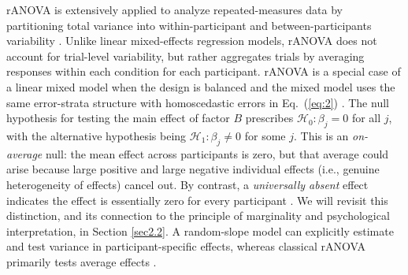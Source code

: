 \documentclass[preprint,12pt,authoryear]{elsarticle}
\begin{document}
rANOVA is extensively applied to analyze repeated-measures data by partitioning total variance into within-participant and between-participants variability \citetext{%
	\citealp[chap.~14]{howell_statistical_2012}; %
	\citealp[chap.~10]{janczyk_understanding_2023}; %
	\citealp[chap.~12]{maxwell_designing_2017}; %
	\citealp[chap.~5]{verma_repeated_2015}}.
Unlike linear mixed-effects regression models, rANOVA does not account for trial-level variability, but rather aggregates trials by averaging responses within each condition for each participant. rANOVA is a special case of a linear mixed model when the design is balanced and the mixed model uses the same error-strata structure with homoscedastic errors in Eq.~(\ref{eq:2}) \citep{pinheiro_mixed-effects_2000}. The null hypothesis for testing the main effect of factor $B$ prescribes $\mathcal{H}_0: \beta_j=0$ for all $j$, with the alternative hypothesis being $\mathcal{H}_1: \beta_j\neq0$ for some $j$. This is an \textit{on-average} null: the mean effect across participants is zero, but that average could arise because large positive and large negative individual effects (i.e., genuine heterogeneity of effects) cancel out. By contrast, a \textit{universally absent} effect indicates the effect is essentially zero for every participant \citep{miller_implications_2018}. We will revisit this distinction, and its connection to the principle of marginality and psychological interpretation, in Section \ref{sec2.2}. A random-slope model can explicitly estimate and test variance in participant-specific effects, whereas classical rANOVA primarily tests average effects \citep{haaf_developing_2017}.
\end{document}
